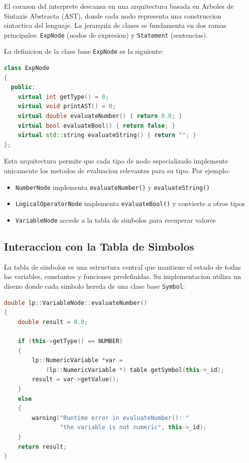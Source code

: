 \documentclass[11pt,a4paper]{article}
\begin{document}
El corazon del interprete descansa en una arquitectura basada en Arboles de Sintaxis Abstracta (AST), donde cada nodo representa una construccion sintactica del lenguaje. La jerarquia de clases se fundamenta en dos ramas principales: \texttt{ExpNode} (nodos de expresion) y \texttt{Statement} (sentencias).

La definicion de la clase base \texttt{ExpNode} es la siguiente:

\begin{lstlisting}[language=C++, caption={Clase base ExpNode con metodos virtuales puros}]
class ExpNode 
{
  public:
    virtual int getType() = 0;
    virtual void printAST() = 0;
    virtual double evaluateNumber() { return 0.0; }
    virtual bool evaluateBool() { return false; }
    virtual std::string evaluateString() { return ""; }
};
\end{lstlisting}

Esta arquitectura permite que cada tipo de nodo especializado implemente unicamente los metodos de evaluacion relevantes para su tipo. Por ejemplo:

\begin{itemize}
    \item \texttt{NumberNode} implementa \texttt{evaluateNumber()} y \texttt{evaluateString()}
    \item \texttt{LogicalOperatorNode} implementa \texttt{evaluateBool()} y convierte a otros tipos
    \item \texttt{VariableNode} accede a la tabla de simbolos para recuperar valores
\end{itemize}

\subsection{Interaccion con la Tabla de Simbolos}

La tabla de simbolos es una estructura central que mantiene el estado de todas las variables, constantes y funciones predefinidas. Su implementacion utiliza un diseno donde cada simbolo hereda de una clase base \texttt{Symbol}:

\begin{lstlisting}[language=C++, caption={Consulta de variable en la tabla de simbolos}]
double lp::VariableNode::evaluateNumber() 
{ 
    double result = 0.0;
    
    if (this->getType() == NUMBER)
    {
        lp::NumericVariable *var = 
            (lp::NumericVariable *) table.getSymbol(this->_id);
        result = var->getValue();
    }
    else
    {
        warning("Runtime error in evaluateNumber(): " 
                "the variable is not numeric", this->_id);
    }
    return result;
}
\end{lstlisting}
\end{document}
